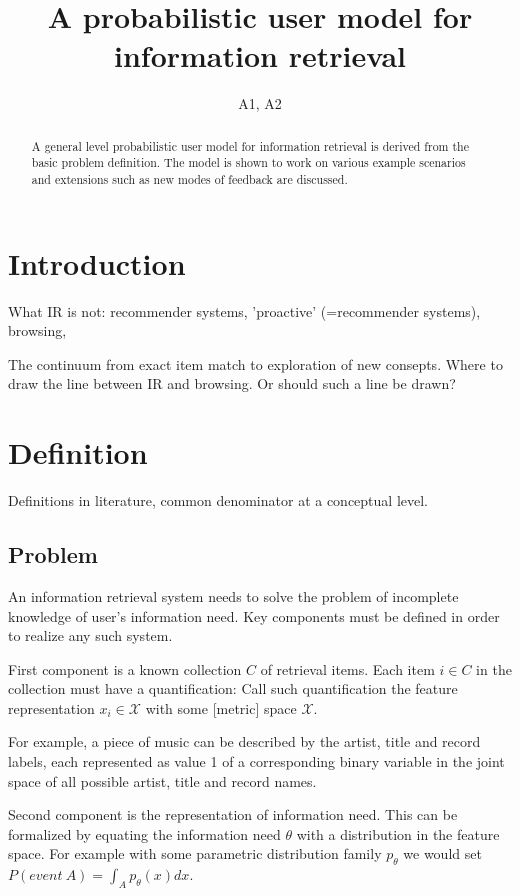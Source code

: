 \documentclass[10pt]{tufte-handout}
\title{A probabilistic user model for information retrieval}
\author{A1, A2}
\date{}
\begin{document}
\maketitle
\begin{abstract}
 A general level probabilistic user model for information retrieval is derived from the basic problem definition. The model is shown to work on various example scenarios and extensions such as new modes of feedback are discussed.
\end{abstract}

\section{Introduction}

What IR is not: recommender systems, 'proactive' (=recommender systems), browsing, 

The continuum from exact item match to exploration of new consepts. Where to draw the line between IR and browsing. Or should such a line be drawn?




\section{Definition}

Definitions in literature, common denominator at a conceptual level.

\subsection{Problem}
An information retrieval system needs to solve the problem of incomplete knowledge of user's information need. Key components must be defined in order to realize any such system.

First component is a known collection $C$ of retrieval items. Each item $i \in C$ in the collection must have a quantification: Call such quantification the feature representation $x_i\in \mathcal X$ with some [metric] space $\mathcal X$. 

For example, a piece of music can be described by the artist, title and record labels, each represented as value 1 of a corresponding binary variable in the joint space of all possible artist, title and record names. 

Second component is the representation of information need. This can be formalized by equating the information need $\theta$ with a distribution in the feature space. For example with some parametric distribution family $p_\theta$ we would set $P(event\ A) = \int_A p_\theta (x) dx$.
\end{document}
